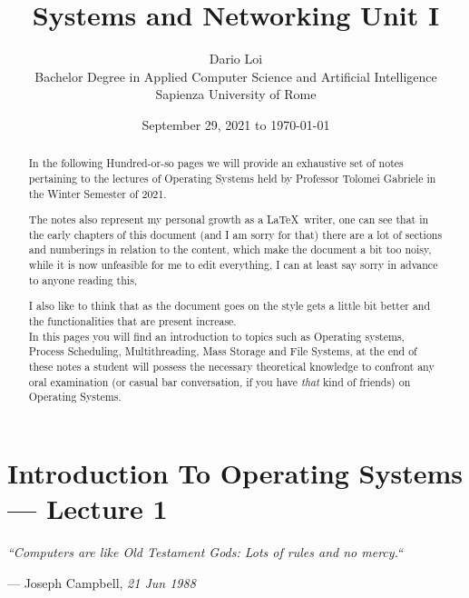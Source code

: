 \documentclass[openright, twoside]{report}
\title{\huge Systems and Networking Unit I}
\date{\small September 29, 2021 to \today}
\author{\large Dario Loi\\[6pt] \medskip \small Bachelor Degree in Applied Computer Science and Artificial Intelligence\\ \medskip  Sapienza University of Rome}
\theoremstyle{definition}
\theoremstyle{example}
\begin{document}
\newcommand{\chapterquote}[3]{ %
	\begin{flushleft}
			\textit{
				``#1``
			}
		\end{flushleft}
		\begin{flushright} 
			--- #2, \textit{#3}
		\end{flushright}
}


\maketitle

\begin{abstract}
    
	In the following Hundred-or-so pages we will provide an 
	exhaustive set of notes pertaining to the lectures of 
	Operating Systems held by Professor Tolomei Gabriele 
	in the Winter Semester of 2021.

	The notes also represent my personal growth as a \LaTeX \ writer, 
	one can see that in the early chapters of this 
	document (and I am sorry for that) there are a lot of 
	sections and numberings in relation to the content, which 
	make the document a bit too noisy, while it is now unfeasible 
	for me to edit everything, I can at least say sorry in advance 
	to anyone reading this,

	I also like to think that as the document goes on the style 
	gets a little bit better and the functionalities that are 
	present increase.\\

	In this pages you will find an introduction to topics such as 
	Operating systems, Process Scheduling, Multithreading, Mass Storage 
	and File Systems, at the end of these notes a student will possess the 
	necessary theoretical knowledge to confront any oral examination 
	(or casual bar conversation, if you have \emph{that} kind of friends)
	on Operating Systems.\\
    
\end{abstract}

\tableofcontents


\VerbatimFootnotes

\chapter{Introduction To Operating Systems --- Lecture 1}

\chapterquote{Computers are like Old Testament Gods: Lots of rules and no mercy.}{Joseph Campbell}{21 Jun 1988}
\end{document}
